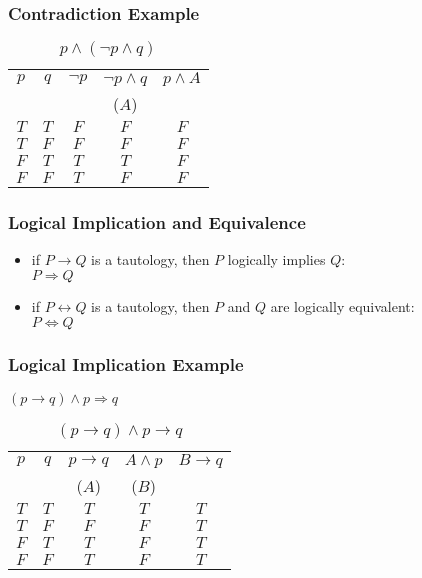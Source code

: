 \documentclass[dvipsnames]{beamer}
\begin{document}
\begin{frame}
  \frametitle{Contradiction Example}

  \begin{table}
    \caption{$p \wedge (\neg p \wedge q)$}
    \begin{tabular}{|c|c|c|c||c|}\hline
      $p$ & $q$ & $\neg p$ & $\neg p \wedge q$ & $p \wedge A$\\
          &     &          & ($A$)             &\\\hline\hline
      $T$ & $T$ & $F$ & $F$ & $F$\\\hline
      $T$ & $F$ & $F$ & $F$ & $F$\\\hline
      $F$ & $T$ & $T$ & $T$ & $F$\\\hline
      $F$ & $F$ & $T$ & $F$ & $F$\\\hline
    \end{tabular}
  \end{table}
\end{frame}

\begin{frame}
  \frametitle{Logical Implication and Equivalence}

  \begin{itemize}
    \item if $P \rightarrow Q$ is a tautology,
      then $P$ \alert{logically implies} $Q$:\\
      $P \Rightarrow Q$

    \pause
    \medskip
    \item if $P \leftrightarrow Q$ is a tautology,
      then $P$ and $Q$ are \alert{logically equivalent}:\\
      $P \Leftrightarrow Q$
  \end{itemize}
\end{frame}

\begin{frame}
  \frametitle{Logical Implication Example}

  $(p \rightarrow q) \wedge p \Rightarrow q$

  \begin{table}
    \caption{$(p \rightarrow q) \wedge p \rightarrow q$}
    \begin{tabular}{|c|c|c|c||c|}\hline
      $p$ & $q$ & $p \rightarrow q$ & $A \wedge p$ & $B \rightarrow q$\\
          &     & ($A$)             & ($B$)        &\\\hline\hline
      $T$ & $T$ & $T$ & $T$ & $T$\\\hline
      $T$ & $F$ & $F$ & $F$ & $T$\\\hline
      $F$ & $T$ & $T$ & $F$ & $T$\\\hline
      $F$ & $F$ & $T$ & $F$ & $T$\\\hline
    \end{tabular}
  \end{table}
\end{frame}
\end{document}
